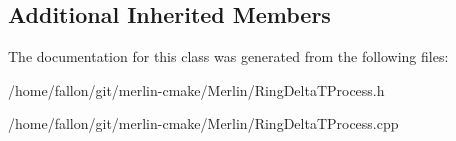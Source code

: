 \subsection*{Additional Inherited Members}


The documentation for this class was generated from the following files\+:\begin{DoxyCompactItemize}
\item 
/home/fallon/git/merlin-\/cmake/\+Merlin/Ring\+Delta\+T\+Process.\+h\item 
/home/fallon/git/merlin-\/cmake/\+Merlin/Ring\+Delta\+T\+Process.\+cpp\end{DoxyCompactItemize}
